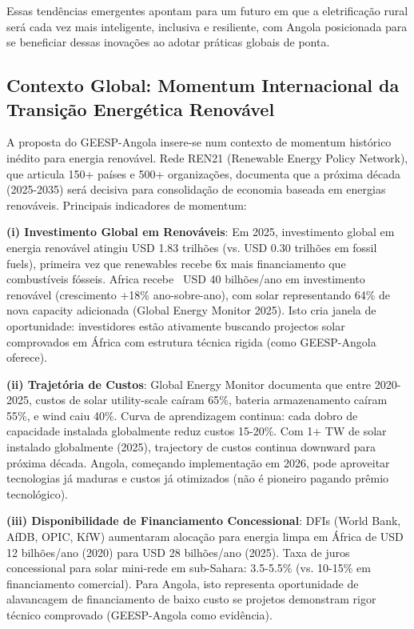 \documentclass[12pt, a4paper]{article}
\begin{document}
Essas tendências emergentes apontam para um futuro em que a eletrificação rural será cada vez mais inteligente, inclusiva e resiliente, com Angola posicionada para se beneficiar dessas inovações ao adotar práticas globais de ponta.

\subsection{Contexto Global: Momentum Internacional da Transição Energética Renovável}

A proposta do GEESP-Angola insere-se num contexto de momentum histórico inédito para energia renovável. Rede REN21 (Renewable Energy Policy Network), que articula 150+ países e 500+ organizações, documenta que a próxima década (2025-2035) será decisiva para consolidação de economia baseada em energias renováveis. Principais indicadores de momentum:

\textbf{(i) Investimento Global em Renováveis}: Em 2025, investimento global em energia renovável atingiu USD 1.83 trilhões (vs. USD 0.30 trilhões em fossil fuels), primeira vez que renewables recebe 6x mais financiamento que combustíveis fósseis. Africa recebe ~USD 40 bilhões/ano em investimento renovável (crescimento +18\% ano-sobre-ano), com solar representando 64\% de nova capacity adicionada (Global Energy Monitor 2025). Isto cria janela de oportunidade: investidores estão ativamente buscando projectos solar comprovados em África com estrutura técnica rigida (como GEESP-Angola oferece).

\textbf{(ii) Trajetória de Custos}: Global Energy Monitor documenta que entre 2020-2025, custos de solar utility-scale caíram 65\%, bateria armazenamento caíram 55\%, e wind caiu 40\%. Curva de aprendizagem continua: cada dobro de capacidade instalada globalmente reduz custos 15-20\%. Com 1+ TW de solar instalado globalmente (2025), trajectory de custos continua downward para próxima década. Angola, começando implementação em 2026, pode aproveitar tecnologias já maduras e custos já otimizados (não é pioneiro pagando prêmio tecnológico).

\textbf{(iii) Disponibilidade de Financiamento Concessional}: DFIs (World Bank, AfDB, OPIC, KfW) aumentaram alocação para energia limpa em África de USD 12 bilhões/ano (2020) para USD 28 bilhões/ano (2025). Taxa de juros concessional para solar mini-rede em sub-Sahara: 3.5-5.5\% (vs. 10-15\% em financiamento comercial). Para Angola, isto representa oportunidade de alavancagem de financiamento de baixo custo se projetos demonstram rigor técnico comprovado (GEESP-Angola como evidência).
\end{document}
